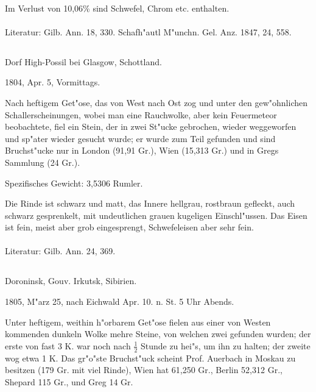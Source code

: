 \documentclass[a4paper, 11pt, oneside]{article}
\begin{document}
\paragraph{}
Im Verlust von 10,06\% sind Schwefel, Chrom etc. enthalten.
\normalsize
\paragraph{}
Literatur: Gilb. Ann. 18, 330. Schafh"autl M"unchn. Gel. Anz. 1847, 24, 558.
\subsection{}
\LARGE
\paragraph{}
Dorf High-Possil bei Glasgow, Schottland.

1804, Apr. 5, Vormittags.

Nach heftigem Get"ose, das von West nach Ost zog und unter den gew"ohnlichen Schallerscheinungen, wobei man eine Rauchwolke, aber kein Feuermeteor beobachtete, fiel ein Stein, der in zwei St"ucke gebrochen, wieder weggeworfen und sp"ater wieder gesucht wurde; er wurde zum Teil gefunden und sind Bruchst"ucke nur in London (91,91 Gr.), Wien (15,313 Gr.) und in Gregs Sammlung (24 Gr.).

Spezifisches Gewicht: 3,5306 Rumler.

Die Rinde ist schwarz und matt, das Innere hellgrau, rostbraun gefleckt, auch schwarz gesprenkelt, mit undeutlichen grauen kugeligen Einschl"ussen. Das Eisen ist fein, meist aber grob eingesprengt, Schwefeleisen aber sehr fein.
\normalsize
\paragraph{}
Literatur: Gilb. Ann. 24, 369.
\subsection{}
\LARGE
\paragraph{}
Doroninsk, Gouv. Irkutsk, Sibirien.

1805, M"arz 25, nach Eichwald Apr. 10. n. St. 5 Uhr Abends.

Unter heftigem, weithin h"orbarem Get"ose fielen aus einer von Westen kommenden dunkeln Wolke mehre Steine, von welchen zwei gefunden wurden; der erste von fast 3 K. war noch nach $\mathfrak{\frac{1}{2}}$ Stunde zu hei"s, um ihn zu halten; der zweite wog etwa 1 K. Das gr"o"ste Bruchst"uck scheint Prof. Auerbach in Moskau zu besitzen (179 Gr. mit viel Rinde), Wien hat 61,250 Gr., Berlin 52,312 Gr., Shepard 115 Gr., und Greg 14 Gr.
\end{document}
